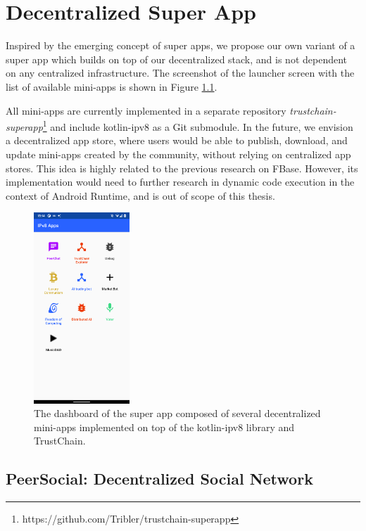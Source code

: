 \fi


\chapter{Decentralized Super App}

Inspired by the emerging concept of super apps, we propose our own variant of a super app which builds on top of our decentralized stack, and is not dependent on any centralized infrastructure. The screenshot of the launcher screen with the list of available mini-apps is shown in Figure \ref{dashboard}.

All mini-apps are currently implemented in a separate repository \textit{trustchain-superapp}\footnote{https://github.com/Tribler/trustchain-superapp} and include kotlin-ipv8 as a Git submodule. In the future, we envision a decentralized app store, where users would be able to publish, download, and update mini-apps created by the community, without relying on centralized app stores. This idea is highly related to the previous research on FBase. However, its implementation would need to further research in dynamic code execution in the context of Android Runtime, and is out of scope of this thesis.

\begin{figure}
    \centering
    \includegraphics[width=0.32\textwidth]{screens/superapp/superapp}
    \caption{The dashboard of the super app composed of several decentralized mini-apps implemented on top of the kotlin-ipv8 library and TrustChain.}
    \label{dashboard}
\end{figure}

\section{PeerSocial: Decentralized Social Network}

